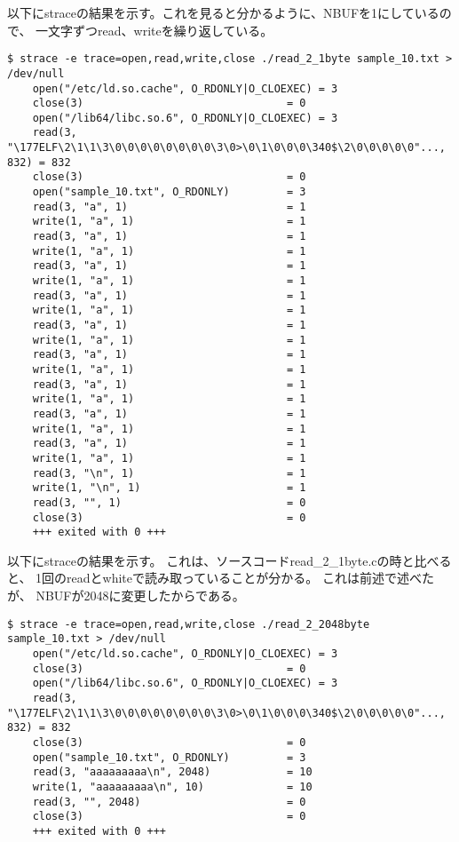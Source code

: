 \documentclass[12pt]{jarticle}
\begin{document}
以下にstraceの結果を示す。これを見ると分かるように、NBUFを1にしているので、
一文字ずつread、writeを繰り返している。
\begin{lstlisting}[style = lstbash]
    $ strace -e trace=open,read,write,close ./read_2_1byte sample_10.txt > /dev/null
    open("/etc/ld.so.cache", O_RDONLY|O_CLOEXEC) = 3
    close(3)                                = 0
    open("/lib64/libc.so.6", O_RDONLY|O_CLOEXEC) = 3
    read(3, "\177ELF\2\1\1\3\0\0\0\0\0\0\0\0\3\0>\0\1\0\0\0\340$\2\0\0\0\0\0"..., 832) = 832
    close(3)                                = 0
    open("sample_10.txt", O_RDONLY)         = 3
    read(3, "a", 1)                         = 1
    write(1, "a", 1)                        = 1
    read(3, "a", 1)                         = 1
    write(1, "a", 1)                        = 1
    read(3, "a", 1)                         = 1
    write(1, "a", 1)                        = 1
    read(3, "a", 1)                         = 1
    write(1, "a", 1)                        = 1
    read(3, "a", 1)                         = 1
    write(1, "a", 1)                        = 1
    read(3, "a", 1)                         = 1
    write(1, "a", 1)                        = 1
    read(3, "a", 1)                         = 1
    write(1, "a", 1)                        = 1
    read(3, "a", 1)                         = 1
    write(1, "a", 1)                        = 1
    read(3, "a", 1)                         = 1
    write(1, "a", 1)                        = 1
    read(3, "\n", 1)                        = 1
    write(1, "\n", 1)                       = 1
    read(3, "", 1)                          = 0
    close(3)                                = 0
    +++ exited with 0 +++
\end{lstlisting}


以下にstraceの結果を示す。
これは、ソースコードread\_2\_1byte.cの時と比べると、
1回のreadとwhiteで読み取っていることが分かる。
これは前述で述べたが、
NBUFが2048に変更したからである。
\begin{lstlisting}[style = lstbash]
    $ strace -e trace=open,read,write,close ./read_2_2048byte sample_10.txt > /dev/null
    open("/etc/ld.so.cache", O_RDONLY|O_CLOEXEC) = 3
    close(3)                                = 0
    open("/lib64/libc.so.6", O_RDONLY|O_CLOEXEC) = 3
    read(3, "\177ELF\2\1\1\3\0\0\0\0\0\0\0\0\3\0>\0\1\0\0\0\340$\2\0\0\0\0\0"..., 832) = 832
    close(3)                                = 0
    open("sample_10.txt", O_RDONLY)         = 3
    read(3, "aaaaaaaaa\n", 2048)            = 10
    write(1, "aaaaaaaaa\n", 10)             = 10
    read(3, "", 2048)                       = 0
    close(3)                                = 0
    +++ exited with 0 +++
\end{lstlisting}
\end{document}
